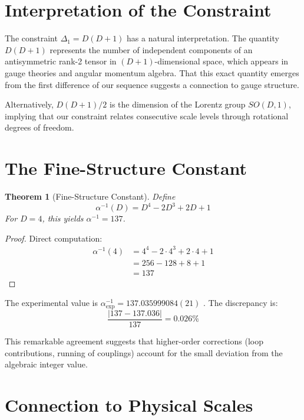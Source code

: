 \documentclass[twocolumn,showpacs,preprintnumbers,amsmath,amssymb,prl]{revtex4-2}
\newtheorem{theorem}{Theorem}
\begin{document}
\section{Interpretation of the Constraint}

The constraint $\Delta_1 = D(D+1)$ has a natural interpretation. The quantity $D(D+1)$ represents the number of independent components of an antisymmetric rank-2 tensor in $(D+1)$-dimensional space, which appears in gauge theories and angular momentum algebra. That this exact quantity emerges from the first difference of our sequence suggests a connection to gauge structure.

Alternatively, $D(D+1)/2$ is the dimension of the Lorentz group $SO(D,1)$, implying that our constraint relates consecutive scale levels through rotational degrees of freedom.

\section{The Fine-Structure Constant}

\begin{theorem}[Fine-Structure Constant]
\label{thm:alpha}
Define
\begin{equation}
\alpha^{-1}(D) = D^4 - 2D^3 + 2D + 1
\label{eq:alpha}
\end{equation}
For $D = 4$, this yields $\alpha^{-1} = 137$.
\end{theorem}

\begin{proof}
Direct computation:
\begin{align}
\alpha^{-1}(4) &= 4^4 - 2 \cdot 4^3 + 2 \cdot 4 + 1 \nonumber\\
&= 256 - 128 + 8 + 1 \nonumber\\
&= 137
\end{align}
\end{proof}

The experimental value is $\alpha^{-1}_{\text{exp}} = 137.035999084(21)$ \cite{CODATA2018}. The discrepancy is:
\begin{equation}
\frac{|137 - 137.036|}{137} = 0.026\%
\end{equation}

This remarkable agreement suggests that higher-order corrections (loop contributions, running of couplings) account for the small deviation from the algebraic integer value.

\section{Connection to Physical Scales}
\end{document}
